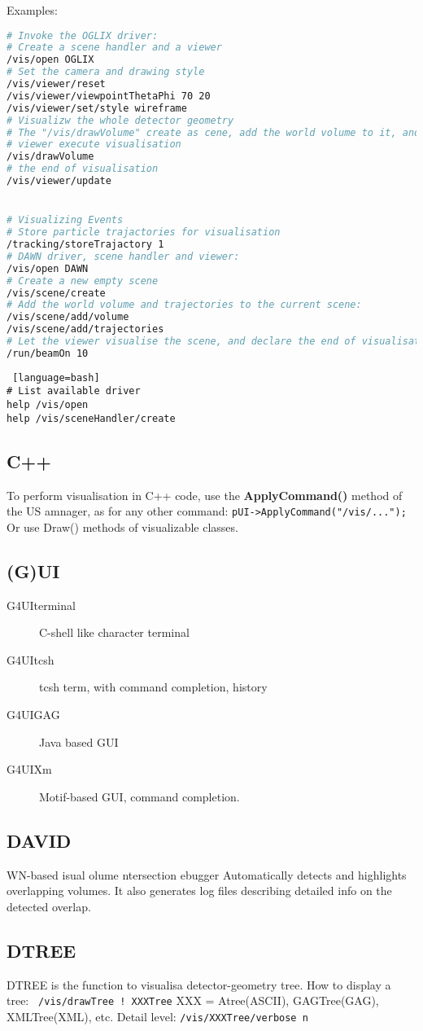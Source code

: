 Examples:
\begin{lstlisting}[language=bash]
# Invoke the OGLIX driver:
# Create a scene handler and a viewer
/vis/open OGLIX
# Set the camera and drawing style
/vis/viewer/reset
/vis/viewer/viewpointThetaPhi 70 20
/vis/viewer/set/style wireframe
# Visualizw the whole detector geometry
# The "/vis/drawVolume" create as cene, add the world volume to it, and let
# viewer execute visualisation
/vis/drawVolume
# the end of visualisation
/vis/viewer/update


# Visualizing Events
# Store particle trajactories for visualisation
/tracking/storeTrajactory 1
# DAWN driver, scene handler and viewer:
/vis/open DAWN
# Create a new empty scene
/vis/scene/create
# Add the world volume and trajectories to the current scene:
/vis/scene/add/volume
/vis/scene/add/trajectories
# Let the viewer visualise the scene, and declare the end of visualisation
/run/beamOn 10
\end{lstlisting}

\begin{lstlisting} [language=bash]
# List available driver 
help /vis/open
help /vis/sceneHandler/create
\end{lstlisting}

\subsection{C++}
To perform visualisation in C++ code, use the \textbf{ApplyCommand()} method
of the US amnager, as for any other command:
\verb|pUI->ApplyCommand("/vis/...");|
Or use Draw() methods of visualizable classes.

\subsection{(G)UI}
\begin{description}
    \item[G4UIterminal]	C-shell like character terminal
    \item[G4UItcsh] tcsh term, with command completion, history
    \item[G4UIGAG] Java based GUI
    \item[G4UIXm] Motif-based GUI, command completion.
\end{description}

\subsection{DAVID}
{\color{red}{DA}}WN-based {\color{red}{V}}isual {\color{red}{V}}olume
{\color{red}{I}}ntersection {\color{red}{D}}ebugger
Automatically detects and highlights overlapping volumes. It also generates
log files describing detailed info on the detected overlap.

\subsection{DTREE}
DTREE is the function to visualisa detector-geometry tree.
How to display a tree:
\verb| /vis/drawTree ! XXXTree|
XXX = Atree(ASCII), GAGTree(GAG), XMLTree(XML), etc.
Detail level: \verb|/vis/XXXTree/verbose n|
